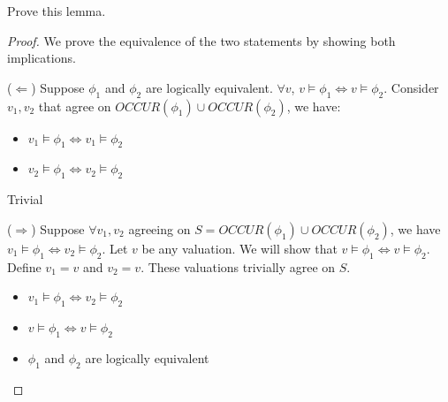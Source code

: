 \documentclass{article}
\begin{document}
Prove this lemma.
\begin{proof}
We prove the equivalence of the two statements by showing both implications.

($\Leftarrow$) Suppose $\phi_1$ and $\phi_2$ are logically equivalent. $\forall v$, $v \models \phi_1 \iff v \models \phi_2$.
Consider $v_1, v_2$ that agree on $OCCUR(\phi_1) \cup OCCUR(\phi_2)$, we have:
\begin{itemize}
    \item $v_1 \models \phi_1 \iff v_1 \models \phi_2$
    \item $v_2 \models \phi_1 \iff v_2 \models \phi_2$
\end{itemize}
Trivial

($\Rightarrow$) Suppose $\forall v_1, v_2$ agreeing on $S = OCCUR(\phi_1) \cup OCCUR(\phi_2)$, we have $v_1 \models \phi_1 \iff v_2 \models \phi_2$.
Let $v$ be any valuation. We will show that $v \models \phi_1 \iff v \models \phi_2$.
Define $v_1 = v$ and $v_2 = v$. These valuations trivially agree on $S$.
\begin{itemize}
    \item $v_1 \models \phi_1 \iff v_2 \models \phi_2$
    \item $v \models \phi_1 \iff v \models \phi_2$
    \item $\phi_1$ and $\phi_2$ are logically equivalent
\end{itemize}

\end{proof}
\end{document}
